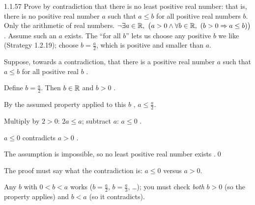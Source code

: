 \begin{bookex}[essential]{1.1.57}
Prove by contradiction that there is no least positive real number: that is, there is no positive real number $a$ such that $a\le b$ for all positive real numbers $b$.
\solution
\given Only the arithmetic of real numbers.
\goal $\neg\exists a\in\mathbb{R},\ \big(a>0\wedge\forall b\in\mathbb{R},\ (b>0\Rightarrow a\le b)\big)$ .
\plan Assume such an $a$ exists. The ``for all $b$'' lets us choose any positive $b$ we like (Strategy 1.2.19); choose $b=\frac a2$, which is positive and smaller than $a$.
\begin{steps}
\item Suppose, towards a contradiction, that there is a positive real number $a$ such that $a\le b$ for all positive real $b$ .
\item Define $b=\frac a2$. Then $b\in\mathbb{R}$ and $b>0$ .
\item By the assumed property applied to this $b$ , $a\le\frac a2$.
\item Multiply by $2>0$: $2a\le a$; subtract $a$: $a\le0$ .
\item $a\le0$ contradicts $a>0$ .
\end{steps}
\conclusion The assumption is impossible, so no least positive real number exists .\qed
\begin{compare}
\item The proof must say what the contradiction is: $a\le0$ versus $a>0$.
\item Any $b$ with $0<b<a$ works ($b=\frac a2$, $b=\frac a3$, \dots); you must check \emph{both} $b>0$ (so the property applies) and $b<a$ (so it contradicts).
\end{compare}
\end{bookex}

